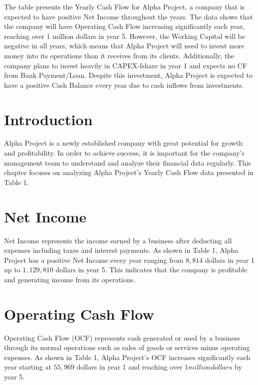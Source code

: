 
The table presents the Yearly Cash Flow for Alpha Project, a company that is expected to have positive Net Income throughout the years. The data shows that the company will have Operating Cash Flow increasing significantly each year, reaching over 1 million dollars in year 5. However, the Working Capital will be negative in all years, which means that Alpha Project will need to invest more money into its operations than it receives from its clients. Additionally, the company plans to invest heavily in CAPEX-fshare in year 1 and expects no CF from Bank Payment/Loan. Despite this investment, Alpha Project is expected to have a positive Cash Balance every year due to cash inflows from investments.

\section{Introduction}

Alpha Project is a newly established company with great potential for growth and profitability. In order to achieve success, it is important for the company's management team to understand and analyze their financial data regularly. This chapter focuses on analyzing Alpha Project's Yearly Cash Flow data presented in Table 1.

\section{Net Income}

Net Income represents the income earned by a business after deducting all expenses including taxes and interest payments. As shown in Table 1, Alpha Project has a positive Net Income every year ranging from $8,814$ dollars in year 1 up to $1,129,810$ dollars in year 5. This indicates that the company is profitable and generating income from its operations.

\section{Operating Cash Flow}

Operating Cash Flow (OCF) represents cash generated or used by a business through its normal operations such as sales of goods or services minus operating expenses. As shown in Table 1, Alpha Project's OCF increases significantly each year starting at $55,969$ dollars in year 1 and reaching over $1 million dollars$ by year 5.

